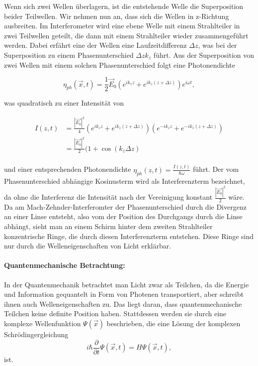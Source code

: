 \documentclass[a4paper,ngerman]{scrartcl}
\begin{document}
Wenn sich zwei Wellen überlagern, ist die entstehende Welle die Superposition beider Teilwellen.
Wir nehmen nun an, dass sich die Wellen in z-Richtung ausbreiten.
Im Interferometer wird eine ebene Welle mit einem Strahlteiler in zwei Teilwellen geteilt, die dann mit einem Strahlteiler wieder
zusammengeführt werden. Dabei erfährt eine der Wellen eine Laufzeitdifferenz $\Delta z$, was bei der Superposition zu
einem Phasenunterschied $\Delta z k_z$ führt. Aus der Superposition von zwei Wellen mit einem solchen Phasenunterschied
folgt eine Photonendichte

\begin{equation}
  \eta_{ph}(\vec{x},t) = \frac{1}{2} \vec{E}_0 \left( e^{i k_z z} + e^{i k_z (z + \Delta z)} \right) e^{i\omega t},
\end{equation}

was quadratisch zu einer Intensität von 

\begin{equation}
  \begin{split}
    I(z,t) &= \frac{|\vec{E_0}|^2 }{4} \left(e^{i k_z z} + e^{i k_z (z + \Delta z)} \right) \left(e^{-i k_z z} + e^{-i k_z (z + \Delta z)} \right)\\
    &= \frac{|\vec{E_0}|^2}{2}(1+\cos(k_z\Delta z)\\
  \end{split}
\end{equation}

und einer entsprechenden Photonendichte $\eta_{ph}(z,t) = \frac{I(z,t)}{\hbar \omega}$ führt. Der vom Phasenunterschied abhängige
Kosinusterm wird als Interferenzterm bezeichnet, da ohne die Interferenz die Intensität nach der Vereinigung konstant $\frac{|\vec{E_0}|^2}{2}$
wäre. Da am Mach-Zehnder-Interferomter der Phasenunterschied durch die Divergenz an einer Linse entsteht, also vom der Position des Durchgangs
durch die Linse abhängt, sieht man an einem Schirm hinter dem zweiten Strahlteiler konzentrische Ringe, die durch diesen Interferenzterm
entstehen. Diese Ringe sind nur durch die Welleneigenschaften von Licht erklärbar.

\paragraph{Quantenmechanische Betrachtung:}
In der Quantenmechanik betrachtet man Licht zwar als Teilchen, da die Energie und Information gequantelt in Form von Photenen
transportiert, aber schreibt ihnen auch Welleneigenschaften zu. Das liegt daran, dass quantenmechanische Teilchen keine definite
Position haben. Stattdessen werden sie durch eine komplexe Wellenfunktion $\Psi(\vec{x})$ beschrieben, die eine Lösung der
komplexen Schrödingergleichung 
\begin{equation}
  i \hbar \frac{\partial}{\partial t} \Psi(\vec{x},t) = H \Psi(\vec{x},t),
\end{equation}
ist.
\end{document}
